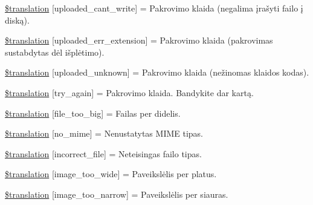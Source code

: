 \begin{DoxyCompactItemize}
\item 
\hyperlink{class_8upload_8lt___l_t_8php_af368fee3b41bc05e6b208c1557a00c00}{\$translation} \mbox{[}\textquotesingle{}uploaded\+\_\+cant\+\_\+write\textquotesingle{}\mbox{]} = \textquotesingle{}Pakrovimo klaida (negalima įrašyti failo į diską).\textquotesingle{}
\item 
\hyperlink{class_8upload_8lt___l_t_8php_a01c69a4c8556602b3892dce727bace11}{\$translation} \mbox{[}\textquotesingle{}uploaded\+\_\+err\+\_\+extension\textquotesingle{}\mbox{]} = \textquotesingle{}Pakrovimo klaida (pakrovimas sustabdytas dėl išplėtimo).\textquotesingle{}
\item 
\hyperlink{class_8upload_8lt___l_t_8php_a4a9168e922b827e6a28b5db1c00774ca}{\$translation} \mbox{[}\textquotesingle{}uploaded\+\_\+unknown\textquotesingle{}\mbox{]} = \textquotesingle{}Pakrovimo klaida (nežinomas klaidos kodas).\textquotesingle{}
\item 
\hyperlink{class_8upload_8lt___l_t_8php_a3afc377bd803683314f413a814243066}{\$translation} \mbox{[}\textquotesingle{}try\+\_\+again\textquotesingle{}\mbox{]} = \textquotesingle{}Pakrovimo klaida. Bandykite dar kartą.\textquotesingle{}
\item 
\hyperlink{class_8upload_8lt___l_t_8php_a476278eb4a0c3df56af068e2d511a741}{\$translation} \mbox{[}\textquotesingle{}file\+\_\+too\+\_\+big\textquotesingle{}\mbox{]} = \textquotesingle{}Failas per didelis.\textquotesingle{}
\item 
\hyperlink{class_8upload_8lt___l_t_8php_a191a55df8e3bb7f3c51b70f3c1932e02}{\$translation} \mbox{[}\textquotesingle{}no\+\_\+mime\textquotesingle{}\mbox{]} = \textquotesingle{}Nenustatytas M\+I\+M\+E tipas.\textquotesingle{}
\item 
\hyperlink{class_8upload_8lt___l_t_8php_a4d32343e2699edd6fd435f9c832cb9c7}{\$translation} \mbox{[}\textquotesingle{}incorrect\+\_\+file\textquotesingle{}\mbox{]} = \textquotesingle{}Neteisingas failo tipas.\textquotesingle{}
\item 
\hyperlink{class_8upload_8lt___l_t_8php_a0dd3e4930ca1f59ae280f4b1006525cd}{\$translation} \mbox{[}\textquotesingle{}image\+\_\+too\+\_\+wide\textquotesingle{}\mbox{]} = \textquotesingle{}Paveikslėlis per platus.\textquotesingle{}
\item 
\hyperlink{class_8upload_8lt___l_t_8php_a5c9a4cd67fd21c32e0a3b434591a6037}{\$translation} \mbox{[}\textquotesingle{}image\+\_\+too\+\_\+narrow\textquotesingle{}\mbox{]} = \textquotesingle{}Paveikslėlis per siauras.\textquotesingle{}
\item 

\end{DoxyCompactItemize}
